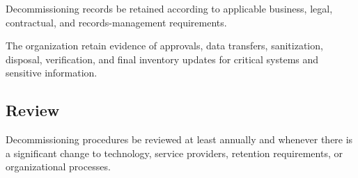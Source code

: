 Decommissioning records \must{} be retained according to applicable business, legal, contractual, and records-management requirements.

The organization \should{} retain evidence of approvals, data transfers, sanitization, disposal, verification, and final inventory updates for critical systems and sensitive information.

\subsection{Review}

Decommissioning procedures \should{} be reviewed at least annually and whenever there is a significant change to technology, service providers, retention requirements, or organizational processes.